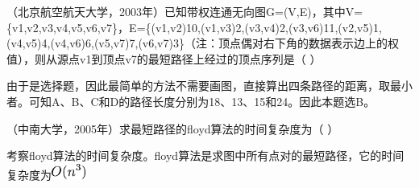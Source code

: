 \question （北京航空航天大学，2003年）已知带权连通无向图G=(V,E)，其中V=\{v1,v2,v3,v4,v5,v6,v7\}，E=\{(v1,v2)10,(v1,v3)2,(v3,v4)2,(v3,v6)11,(v2,v5)1,(v4,v5)4,(v4,v6)6,(v5,v7)7,(v6,v7)3\}（注：顶点偶对右下角的数据表示边上的权值），则从源点v1到顶点v7的最短路径上经过的顶点序列是（
）
\par{}
\begin{solution}由于是选择题，因此最简单的方法不需要画图，直接算出四条路径的距离，取最小者。可知A、B、C和D的路径长度分别为18、13、15和24。因此本题选B。
\end{solution}
\question （中南大学，2005年）求最短路径的floyd算法的时间复杂度为（ ）
\par{}
\begin{solution}考察floyd算法的时间复杂度。floyd算法是求图中所有点对的最短路径，它的时间复杂度为\includegraphics[width=0.43750in,height=0.19792in]{texmath/6054ee5Cdpi7B3507DO28n5E329}
\end{solution}
